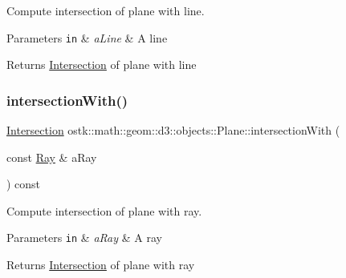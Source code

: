 Compute intersection of plane with line. 


\begin{DoxyParams}[1]{Parameters}
\mbox{\tt in}  & {\em a\+Line} & A line \\
\hline
\end{DoxyParams}
\begin{DoxyReturn}{Returns}
\hyperlink{classostk_1_1math_1_1geom_1_1d3_1_1_intersection}{Intersection} of plane with line 
\end{DoxyReturn}
\mbox{\label{classostk_1_1math_1_1geom_1_1d3_1_1objects_1_1_plane_aa7a3428e047dee047890f82893abd8d7}} 
\subsubsection{\texorpdfstring{intersection\+With()}{intersectionWith()}\hspace{0.1cm}{\footnotesize\ttfamily [4/5]}}
{\footnotesize\ttfamily \hyperlink{classostk_1_1math_1_1geom_1_1d3_1_1_intersection}{Intersection} ostk\+::math\+::geom\+::d3\+::objects\+::\+Plane\+::intersection\+With (\begin{DoxyParamCaption}\item[{const \hyperlink{classostk_1_1math_1_1geom_1_1d3_1_1objects_1_1_ray}{Ray} \&}]{a\+Ray }\end{DoxyParamCaption}) const}



Compute intersection of plane with ray. 


\begin{DoxyParams}[1]{Parameters}
\mbox{\tt in}  & {\em a\+Ray} & A ray \\
\hline
\end{DoxyParams}
\begin{DoxyReturn}{Returns}
\hyperlink{classostk_1_1math_1_1geom_1_1d3_1_1_intersection}{Intersection} of plane with ray 
\end{DoxyReturn}
\mbox{\label{classostk_1_1math_1_1geom_1_1d3_1_1objects_1_1_plane_a0c76a99ec76e6f1dc5fc5b39737b282e}} 
